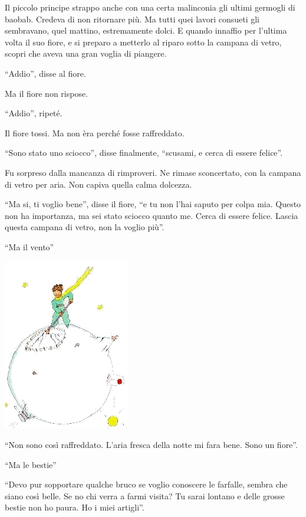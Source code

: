 \documentclass[11pt]{scrbook}
\begin{document}
Il piccolo principe strappo anche con una certa malinconia gli ultimi
germogli di baobab. Credeva di non ritornare più. Ma tutti quei lavori
consueti gli sembravano, quel mattino, estremamente dolci. E quando
innaffio per l'ultima volta il suo fiore, e si preparo a metterlo al
riparo sotto la campana di vetro, scopri che aveva una gran voglia di
piangere.

``Addio'', disse al fiore.

Ma il fiore non rispose.

``Addio'', ripeté.

Il fiore tossi. Ma non èra perché fosse raffreddato.

``Sono stato uno sciocco'', disse finalmente, ``scusami, e cerca di
essere felice''.

Fu sorpreso dalla mancanza di rimproveri. Ne rimase sconcertato, con la
campana di vetro per aria. Non capiva quella calma dolcezza.

``Ma si, ti voglio bene'', disse il fiore, ``e tu non l'hai saputo per
colpa mia. Questo non ha importanza, ma sei stato sciocco quanto me.
Cerca di essere felice. Lascia questa campana di vetro, non la voglio
più''.

``Ma il vento''

\begin{center}
\includegraphics{img/9a}
\end{center}

``Non sono così raffreddato. L'aria fresca della notte mi fara bene.
Sono un fiore''.

``Ma le bestie''

``Devo pur sopportare qualche bruco se voglio conoscere le farfalle,
sembra che siano così belle. Se no chi verra a farmi visita? Tu sarai
lontano e delle grosse bestie non ho paura. Ho i miei artigli''.
\end{document}
